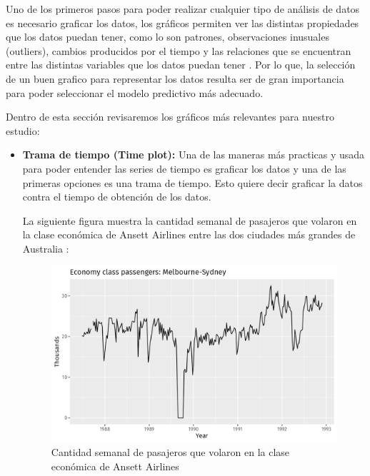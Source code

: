 Uno de los primeros pasos para poder realizar cualquier tipo de análisis de datos es necesario graficar los datos, los gráficos permiten ver las distintas propiedades que los datos puedan tener, como lo son patrones, observaciones inusuales (outliers), cambios producidos por el tiempo y las relaciones que se encuentran entre las distintas variables que los datos puedan tener \cite{forecast-time-series-arima}. Por lo que, la selección de un buen grafico para representar los datos resulta ser de gran importancia para poder seleccionar el modelo predictivo más adecuado.

Dentro de esta sección revisaremos los gráficos más relevantes para nuestro estudio:


\begin{itemize}
    \item \textbf{Trama de tiempo (Time plot):} Una de las maneras más practicas y usada para poder entender las series de tiempo es graficar los datos y una de las primeras opciones es una trama de tiempo. Esto quiere decir graficar la datos contra el tiempo de obtención de los datos.
    
    La siguiente figura muestra la cantidad semanal de pasajeros que volaron en la clase económica de Ansett Airlines entre las dos ciudades más grandes de Australia \cite{forecast-time-series-arima}:

    \begin{figure}[H]
        \begin{minipage}[t]{0.9\textwidth}
            \caption{Cantidad semanal de pasajeros que volaron en la clase económica de Ansett Airlines}
            \label{timeplot}        
        \end{minipage}
    
        \vspace{10pt}
    
        \begin{minipage}[b]{1.1\textwidth}
            \centering
            \includegraphics[width=\textwidth]{img/pasajeros-clase-econ-timeplot.png}        
        \end{minipage}
    

\end{figure}
\end{itemize}

